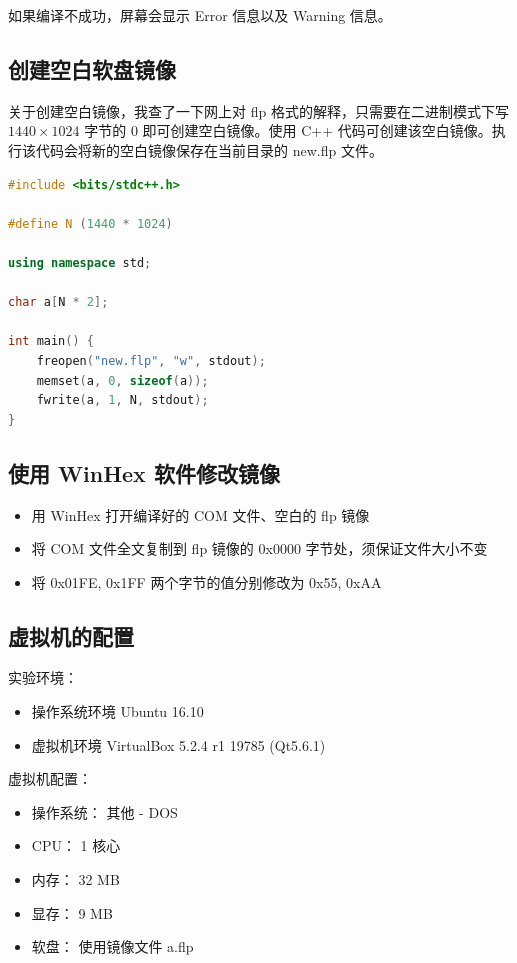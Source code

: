 \documentclass{article}
\begin{document}
如果编译不成功，屏幕会显示 Error 信息以及 Warning 信息。

\subsection{创建空白软盘镜像}

关于创建空白镜像，我查了一下网上对 flp 格式的解释，只需要在二进制模式下写 $1440 \times 1024$ 字节的 $0$ 即可创建空白镜像。使用 C++ 代码可创建该空白镜像。执行该代码会将新的空白镜像保存在当前目录的 new.flp 文件。

\begin{lstlisting}[language=C++]
#include <bits/stdc++.h>

#define N (1440 * 1024)

using namespace std;

char a[N * 2];

int main() {
	freopen("new.flp", "w", stdout);
	memset(a, 0, sizeof(a));
	fwrite(a, 1, N, stdout);
}

\end{lstlisting}

\subsection{使用 WinHex 软件修改镜像}

\begin{itemize}
\item 用 WinHex 打开编译好的 COM 文件、空白的 flp 镜像
\item 将 COM 文件全文复制到 flp 镜像的 0x0000 字节处，须保证文件大小不变
\item 将 0x01FE, 0x1FF 两个字节的值分别修改为 0x55, 0xAA
\end{itemize}

\subsection{虚拟机的配置}

实验环境：

\begin{itemize}
\item 操作系统环境 Ubuntu 16.10
\item 虚拟机环境 VirtualBox 5.2.4 r1 19785 (Qt5.6.1)
\end{itemize}

虚拟机配置：

\begin{itemize}
\item 操作系统： 其他 - DOS
\item CPU： 1 核心
\item 内存： 32 MB
\item 显存： 9 MB
\item 软盘： 使用镜像文件 a.flp
\end{itemize}
\end{document}
